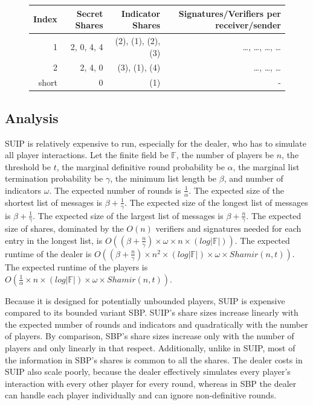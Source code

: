 \documentclass{dalcsthesis}
\begin{document}
\begin{figure}
\begin{itemize}
      \begin{tabular}{|r|r|r|r|}
      \hline
        Index & Secret Shares & Indicator Shares & Signatures/Verifiers per receiver/sender \\
      \hline
        1 & 2, 0, 4, 4 & (2), (1), (2), (3) & \ldots, \ldots, \ldots, \ldots\\
      \hline
        2 & 2, 4, 0 & (3), (1), (4) & \ldots, \ldots, \ldots\\
      \hline
        short & 0 & (1) & -\\
      \hline
      \end{tabular}
  \end{itemize}
\end{figure}

\subsection{Analysis}

SUIP is relatively expensive to run, especially for the dealer, who has to simulate all player interactions. Let the finite field be $\mathbb{F}$, the number of players be $n$, the threshold be $t$, the marginal definitive round probability be $\alpha$, the marginal list termination probability be $\gamma$, the minimum list length be $\beta$, and number of indicators $\omega$. The expected number of rounds is $\frac{1}{\alpha}$. The expected size of the shortest list of messages is $\beta + \frac{1}{\gamma}$. The expected size of the longest list of messages is $\beta + \frac{1}{\gamma}$. The expected size of the largest list of messages is $\beta + \frac{n}{\gamma}$. The expected size of shares, dominated by the $O(n)$ verifiers and signatures needed for each entry in the longest list, is $O((\beta + \frac{n}{\gamma}) \times \omega \times n \times (log |\mathbb{F}|))$. The expected runtime of the dealer is $O((\beta + \frac{n}{\gamma}) \times n^2 \times (log |\mathbb{F}|) \times \omega \times Shamir(n, t))$. The expected runtime of the players is $O(\frac{1}{\alpha} \times n \times (log |\mathbb{F}|) \times \omega \times Shamir(n, t))$.

Because it is designed for potentially unbounded players, SUIP is expensive compared to its bounded variant SBP. SUIP's share sizes increase linearly with the expected number of rounds and indicators and quadratically with the number of players. By comparison, SBP's share sizes increase only with the number of players and only linearly in that respect. Additionally, unlike in SUIP, most of the information in SBP's shares is common to all the shares. The dealer costs in SUIP also scale poorly, because the dealer effectively simulates every player's interaction with every other player for every round, whereas in SBP the dealer can handle each player individually and can ignore non-definitive rounds.
\end{document}
